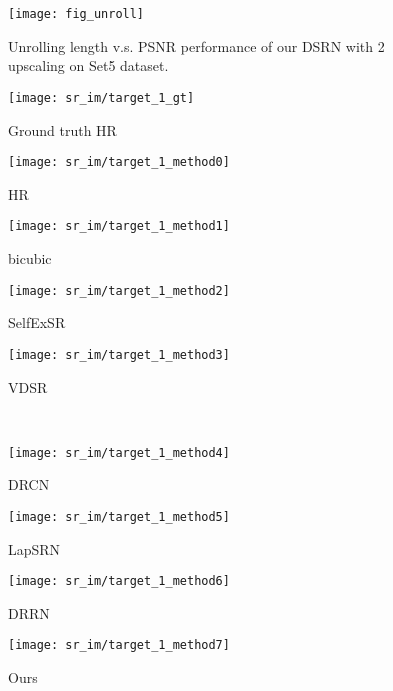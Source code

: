 \documentclass[10pt,twocolumn,letterpaper]{article}
\newcommand{\algname}{DSRN }
\begin{document}
\begin{figure}[t]
\begin{centering}
\texttt{[image: fig\_unroll]}
\par\end{centering}
\caption{Unrolling length v.s. PSNR performance of our \algname with 2 upscaling on Set5 dataset. }
\label{fig:unrollT}
\end{figure}


\begin{figure*}[t!]
\centering


\begin{subfigure}{.24\textwidth}
\texttt{[image: sr\_im/target\_1\_gt]}
 \captionsetup{labelformat=empty,font=scriptsize,skip=2pt}
  \caption{Ground truth HR}
\end{subfigure}\hfill
\parbox{.74\textwidth}{
\begin{subfigure}{.24\linewidth}
\texttt{[image: sr\_im/target\_1\_method0]}
\captionsetup{labelformat=empty,font=scriptsize,skip=2pt}
\caption{HR}
\end{subfigure}
\begin{subfigure}{.24\linewidth}
\texttt{[image: sr\_im/target\_1\_method1]}
\captionsetup{labelformat=empty,font=scriptsize,skip=2pt}
\caption{bicubic}
\end{subfigure}
\begin{subfigure}{.24\linewidth}
\texttt{[image: sr\_im/target\_1\_method2]}
\captionsetup{labelformat=empty,font=scriptsize,skip=2pt}
\caption{SelfExSR\cite{huang2015single}}
\end{subfigure}
\begin{subfigure}{.24\linewidth}
\texttt{[image: sr\_im/target\_1\_method3]}
\captionsetup{labelformat=empty,font=scriptsize,skip=2pt}
\caption{VDSR\cite{kim2016accurate}}
\end{subfigure}\\
\begin{subfigure}{.24\linewidth}
\texttt{[image: sr\_im/target\_1\_method4]}
\captionsetup{labelformat=empty,font=scriptsize,skip=2pt}
\caption{DRCN\cite{kim2016deeply}}
\end{subfigure}
\begin{subfigure}{.24\linewidth}
\texttt{[image: sr\_im/target\_1\_method5]}
\captionsetup{labelformat=empty,font=scriptsize,skip=2pt}
\caption{LapSRN\cite{lai2017deep}}
\end{subfigure}
\begin{subfigure}{.24\linewidth}
\texttt{[image: sr\_im/target\_1\_method6]}
\captionsetup{labelformat=empty,font=scriptsize,skip=2pt}
\caption{DRRN\cite{tai2017image}}
\end{subfigure}
\begin{subfigure}{.24\linewidth}
\texttt{[image: sr\_im/target\_1\_method7]}
\captionsetup{labelformat=empty,font=scriptsize,skip=2pt}
\caption{Ours}
\end{subfigure}}


\end{figure*}
\end{document}
